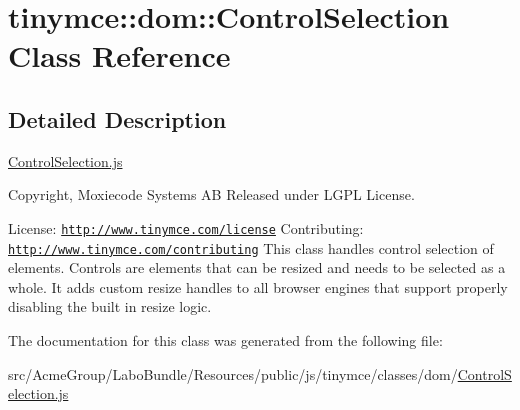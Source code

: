 \hypertarget{classtinymce_1_1dom_1_1_control_selection}{\section{tinymce\+:\+:dom\+:\+:Control\+Selection Class Reference}
\label{classtinymce_1_1dom_1_1_control_selection}
}


\subsection{Detailed Description}
\hyperlink{_control_selection_8js}{Control\+Selection.\+js}

Copyright, Moxiecode Systems A\+B Released under L\+G\+P\+L License.

License\+: \href{http://www.tinymce.com/license}{\tt http\+://www.\+tinymce.\+com/license} Contributing\+: \href{http://www.tinymce.com/contributing}{\tt http\+://www.\+tinymce.\+com/contributing} This class handles control selection of elements. Controls are elements that can be resized and needs to be selected as a whole. It adds custom resize handles to all browser engines that support properly disabling the built in resize logic. 

The documentation for this class was generated from the following file\+:\begin{DoxyCompactItemize}
\item 
src/\+Acme\+Group/\+Labo\+Bundle/\+Resources/public/js/tinymce/classes/dom/\hyperlink{_control_selection_8js}{Control\+Selection.\+js}\end{DoxyCompactItemize}
